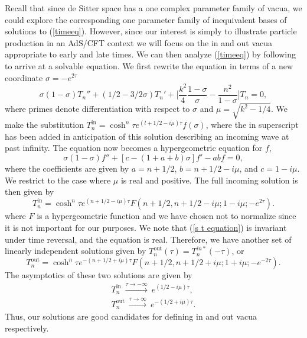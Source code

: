 \documentclass[a4paper,aps,prd,preprintnumbers,groupedaddress]{revtex4}
\begin{document}
Recall that since de Sitter space has a one complex parameter family of vacua, we could explore the corresponding one parameter family of inequivalent bases of solutions to (\ref{timeeq}).  However, since our interest is simply to illustrate particle production in an AdS/CFT context we will focus on the in and out vacua appropriate to early and late times.  We can then analyze (\ref{timeeq}) by following \cite{bms01} to  arrive at a solvable equation.  We first rewrite the equation in terms of a new coordinate $\sigma= - e ^{2\tau} $
\begin{equation}
\sigma(1-\sigma) T_n ''  + (1/2 - 3/2 \sigma) T_n ' + \biggl[\frac{k^2}{4}\frac{1-\sigma}{\sigma} - \frac{n^2}{1-\sigma} \biggr] T_n =0 ,
\end{equation}
where primes denote differentiation with respect to $\sigma$ and $\mu= \sqrt{k^2-1/4}$. We make the substitution $T^{\mathrm{in}} _n = \cosh ^n \tau
e^{(l+1/2 - i \mu)\tau} f(\sigma) $, where the in superscript has been added in anticipation of this solution describing an incoming wave at
past infinity. The equation now becomes a hypergeometric equation for $f$,
\begin{equation}
\sigma(1-\sigma) f'' + [c-(1+a+b)\sigma]f' - ab f =0 ,
\end{equation}
where the coefficients are given by $a=n+1/2$, $b= n +1/2 - i \mu$, and $c=1- i \mu$. We restrict to the case where $\mu$ is real and
positive. The full incoming solution is then given by
\begin{equation} \label{bubble in solution}
T_n ^{\mathrm{in}} =  \cosh ^n \tau e^{(n+1/2 - i \mu) \tau} F(n+1/2, n+1/2-i \mu; 1-i\mu ; - e^{2 \tau} ) .
\end{equation}
where $F$ is a hypergeometric function and we have chosen not to normalize since it is not important for our purposes. We note that (\ref{s
t equation}) is invariant under time reversal, and the equation is real. Therefore, we have another set of linearly independent solutions
given by $T _n ^{\mathrm{{out}}} (\tau) = T_n ^{in*} (-\tau)$, or
\begin{equation} \label{bubble out solution}
T_n ^{\mathrm{{out}}} =  \cosh ^n \tau e^{-(n+1/2 + i \mu) \tau} F(n+1/2, n+1/2+i \mu; 1+i\mu ; - e^{-2 \tau} ) .
\end{equation}
The asymptotics of these two solutions are given by
\begin{eqnarray} \label{asymptotic bubble}
T^{\mathrm{in}} _n ~\stackrel{ {\tau \rightarrow -\infty}}{\longrightarrow} ~  e^{(1/2 - i \mu) \tau} , \nonumber \\
T^{\mathrm{{out}}}_n ~ \stackrel{\tau \rightarrow \infty}{\longrightarrow} ~ e^{-(1/2 + i \mu) \tau} .
\end{eqnarray}
Thus, our solutions are good candidates for defining in and out vacua respectively.
\end{document}
